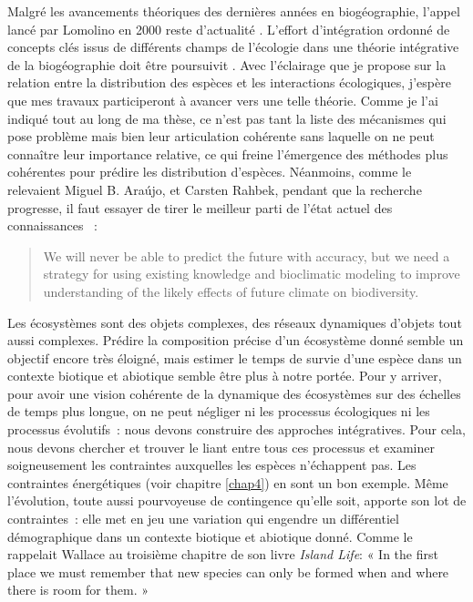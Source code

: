 Malgré les avancements théoriques des dernières années en biogéographie,
l'appel lancé par Lomolino en 2000 reste d'actualité
\citep{Lomolino2000}. L'effort d'intégration ordonné de concepts clés
issus de différents champs de l'écologie dans une théorie intégrative de
la biogéographie doit être poursuivit \citep{Thuiller2013}. Avec
l'éclairage que je propose sur la relation entre la distribution des
espèces et les interactions écologiques, j'espère que mes travaux
participeront à avancer vers une telle théorie. Comme je l'ai indiqué
tout au long de ma thèse, ce n'est pas tant la liste des mécanismes qui
pose problème mais bien leur articulation cohérente sans laquelle on ne
peut connaître leur importance relative, ce qui freine l'émergence des
méthodes plus cohérentes pour prédire les distribution d'espèces.
Néanmoins, comme le relevaient Miguel B. Araújo, et Carsten Rahbek,
pendant que la recherche progresse, il faut essayer de tirer le meilleur
parti de l'état actuel des connaissances \citep{Araujo2006}~:

\begin{quote}
We will never be able to predict the future with accuracy, but we need a
strategy for using existing knowledge and bioclimatic modeling to
improve understanding of the likely effects of future climate on
biodiversity.
\end{quote}

Les écosystèmes sont des objets complexes, des réseaux dynamiques
d'objets tout aussi complexes. Prédire la composition précise d'un
écosystème donné semble un objectif encore très éloigné, mais estimer le
temps de survie d'une espèce dans un contexte biotique et abiotique
semble être plus à notre portée. Pour y arriver, pour avoir une vision
cohérente de la dynamique des écosystèmes sur des échelles de temps plus
longue, on ne peut négliger ni les processus écologiques ni les
processus évolutifs~: nous devons construire des approches intégratives.
Pour cela, nous devons chercher et trouver le liant entre tous ces
processus et examiner soigneusement les contraintes auxquelles les
espèces n'échappent pas. Les contraintes énergétiques (voir chapitre
\ref{chap4}) en sont un bon exemple. Même l'évolution, toute aussi
pourvoyeuse de contingence qu'elle soit, apporte son lot de
contraintes~: elle met en jeu une variation qui engendre un différentiel
démographique dans un contexte biotique et abiotique donné. Comme le
rappelait Wallace au troisième chapitre de son livre \emph{Island Life}:
« In the first place we must remember that new species can only be
formed when and where there is room for them. »
